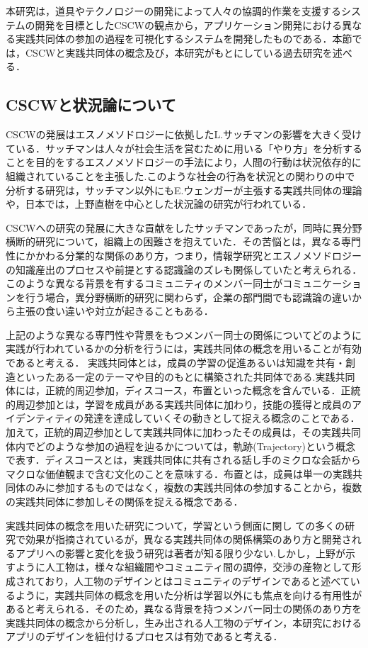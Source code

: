 \documentclass[submit,techrep]{ipsj}
\begin{document}
本研究は，道具やテクノロジーの開発によって人々の協調的作業を支援するシステムの開発を目標としたCSCWの観点から\cite{book1}，アプリケーション開発における異なる実践共同体の参加の過程を可視化するシステムを開発したものである．本節では，CSCWと実践共同体の概念及び，本研究がもとにしている過去研究を述べる．

\subsection{CSCWと状況論について}
CSCWの発展はエスノメソドロジーに依拠したL.サッチマンの影響を大きく受けている．サッチマンは人々が社会生活を営むために用いる「やり方」を分析することを目的をするエスノメソドロジー\cite{book2}の手法により，人間の行動は状況依存的に組織されていることを主張した\cite{book3}.このような社会の行為を状況との関わりの中で分析する研究は，サッチマン以外にもE.ウェンガーが主張する実践共同体\cite{book4}の理論や，日本では，上野直樹を中心とした状況論の研究が行われている\cite{book5}．

CSCWへの研究の発展に大きな貢献をしたサッチマンであったが，同時に異分野横断的研究について，組織上の困難さを抱えていた\cite{book6}．その苦悩とは，異なる専門性にかかわる分業的な関係のあり方，つまり，情報学研究とエスノメソドロジーの知識産出のプロセスや前提とする認識論のズレも関係していたと考えられる\cite{book7}．このような異なる背景を有するコミュニティのメンバー同士がコミュニケーションを行う場合，異分野横断的研究に関わらず，企業の部門間でも認識論の違いから主張の食い違いや対立が起きることもある\cite{book8}．

上記のような異なる専門性や背景をもつメンバー同士の関係についてどのように実践が行われているかの分析を行うには，実践共同体の概念を用いることが有効であると考える．
実践共同体とは，成員の学習の促進あるいは知識を共有・創造といったある一定のテーマや目的のもとに構築された共同体である.実践共同体には，正統的周辺参加，ディスコース，布置といった概念を含んでいる．正統的周辺参加とは，学習を成員がある実践共同体に加わり，技能の獲得と成員のアイデンティティの発達を達成していくその動きとして捉える概念のことである．加えて，正統的周辺参加として実践共同体に加わったその成員は，その実践共同体内でどのような参加の過程を辿るかについては，軌跡(Trajectory)という概念で表す．ディスコースとは，実践共同体に共有される話し手のミクロな会話からマクロな価値観まで含む文化のことを意味する\cite{book9}．布置とは，成員は単一の実践共同体のみに参加するものではなく，複数の実践共同体の参加することから，複数の実践共同体に参加しその関係を捉える概念である\cite{book10}．

実践共同体の概念を用いた研究について，学習という側面に関し ての多くの研究で効果が指摘されているが，異なる実践共同体の関係構築のあり方と開発されるアプリへの影響と変化を扱う研究は著者が知る限り少ない.しかし，上野\cite{book11}が示すように人工物は，様々な組織間やコミュニティ間の調停，交渉の産物として形成されており，人工物のデザインとはコミュニティのデザインであると述べているように，実践共同体の概念を用いた分析は学習以外にも焦点を向ける有用性があると考えられる．そのため，異なる背景を持つメンバー同士の関係のあり方を実践共同体の概念から分析し，生み出される人工物のデザイン，本研究におけるアプリのデザインを紐付けるプロセスは有効であると考える．
\end{document}
